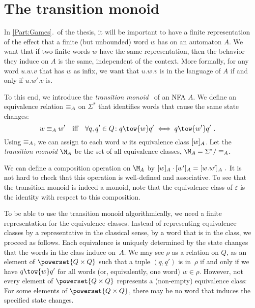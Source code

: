 \documentclass[../../diss.tex]{subfiles}
\begin{document}
\section{The transition monoid}%
\label{Section:TransitionMonoid}%

In \cref{Part:Games}.~of the thesis, it will be important to have a finite representation of the effect that a finite (but unbounded) word $w$ has on an automaton $A$.
We want that if two finite words $w$  have the same representation, then the behavior they induce on $A$ is the same, independent of the context.
More formally, for any word $u.w.v$ that has $w$ as infix, we want that $u.w.v$ is in the language of $A$ if and only if $u.w'.v$ is.

To this end, we introduce the \emph{transition monoid}~\cite{Buechi62,PerrinP04} of an NFA $A$.
We define an equivalence relation $\nfaequiv{A}$ on $\Sigma^*$ that identifies words that cause the same state changes:
\[
    w \nfaequiv{A} w'
    \quad \text{iff} \quad
    \forall q,q' \in Q \colon
    q \tow{w} q' \iff q \tow{w'} q'
    \ .
\]
Using $\nfaequiv{A}$, we can assign to each word $w$ its equivalence class $\nfaequivclass{A}{w}$.
Let the \emph{transition monoid} $\nfatransmonoid{A}$ be the set of all equivalence classes, \ie $\nfatransmonoid{A} = \Sigma^* / \nfaequiv{A}$.

We can define a composition operation on $\nfatransmonoid{A}$ by
\(
    \nfaequivclass{A}{w} \relcomp \nfaequivclass{A}{w'} = \nfaequivclass{A}{w.w'}
    \ .
\)
It is not hard to check that this operation is well-defined and associative.
To see that the transition monoid is indeed a monoid, note that the equivalence class of $\varepsilon$ is the identity with respect to this composition.

To be able to use the transition monoid algorithmically, we need a finite representation for the equivalence classes.
Instead of representing equivalence classes by a representative in the classical sense, \ie by a word that is in the class, we proceed as follows.
Each equivalence  is uniquely determined by the state changes that the words in the class induce on~$A$.
We may see $\rho$ as a relation on $Q$, \ie as an element of $\powerset{Q \times Q}$ such that a tuple $(q,q')$ is in~$\rho$ if and only if we have $q \tow{w} q'$ for all words (or, equivalently, one word) $w \in \rho$.
However, not every element of $\powerset{Q \times Q}$ represents a (non-empty) equivalence class:
For some elements of $\powerset{Q \times Q}$, there may be no word that induces the specified state changes.
\end{document}
